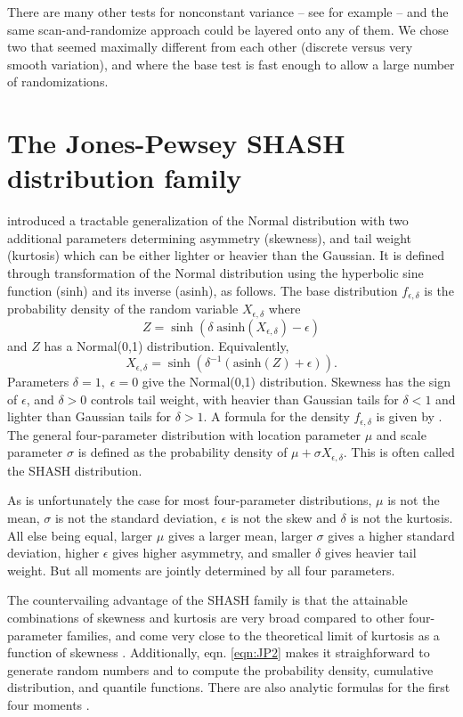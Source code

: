 \documentclass[12pt]{article}
\newcounter{box}
\newcommand{\be}{\begin{equation}}
\newcommand{\ee}{\end{equation}}
\begin{document}
There are many other tests for nonconstant variance -- see for example \cite{Farrar2024} -- and the same scan-and-randomize approach could
be layered onto any of them. We chose two that seemed maximally different from each other (discrete versus very smooth variation), and where the base test
is fast enough to allow a large number of randomizations. 

\section{The Jones-Pewsey SHASH distribution family} 
\label{sec:SHASHdist} 
\citet{jones-pewsey-2009} introduced a tractable generalization of the Normal distribution with two additional parameters determining  
asymmetry (skewness), and tail weight (kurtosis) which can be either lighter or heavier than the Gaussian. It is defined through transformation of the
Normal distribution using the hyperbolic sine function (sinh) and its inverse (asinh), as follows. The base distribution $f_{\epsilon,\delta}$  is the 
probability density of the random variable $X_{\epsilon,\delta}$ where  
\be
Z = \sinh (\delta \; \mbox{asinh}(X_{\epsilon,\delta}) - \epsilon)
\label{eqn:JP1}
\ee
and $Z$ has a Normal(0,1) distribution. Equivalently, 
\be
X_{\epsilon,\delta} = \sinh \left( \delta^{-1} (\mbox{asinh}(Z) + \epsilon)\right).
\label{eqn:JP2}
\ee
Parameters $\delta=1, \; \epsilon=0$ give the Normal(0,1) distribution. Skewness has the sign of $\epsilon$, and
$\delta > 0$ controls tail weight, with heavier than Gaussian tails for $\delta<1$ and lighter than Gaussian tails for $\delta > 1$. 
A formula for the density $f_{\epsilon,\delta}$ is given by \citet[][eqn. 2]{jones-pewsey-2009}. 
The general four-parameter distribution with location parameter $\mu$ and scale parameter $\sigma$ is defined as the probability density 
of $\mu + \sigma X_{\epsilon, \delta}$. This is often called the SHASH distribution. 

As is unfortunately the case for most four-parameter distributions, $\mu$ is not the mean, $\sigma$ is not the standard deviation, $\epsilon$ is not
the skew and $\delta$ is not the kurtosis. All else being equal, larger $\mu$ gives a larger mean, larger $\sigma$ gives a higher
standard deviation, higher $\epsilon$ gives higher asymmetry, and smaller $\delta$ gives heavier tail weight. 
But all moments are jointly determined by all four parameters. 

The countervailing advantage of the SHASH family is that the attainable combinations of skewness and kurtosis are very broad compared to other 
four-parameter families, and come very close to the theoretical limit of kurtosis as a function of skewness \citep[][Fig.  2]{jones-pewsey-2009}. 
Additionally, eqn. \eqref{eqn:JP2} makes it straighforward to generate random numbers and to compute 
the probability density, cumulative distribution, and quantile functions. There are also analytic formulas for the first four moments
\citep[][p. 764]{jones-pewsey-2009}. 
\end{document}
